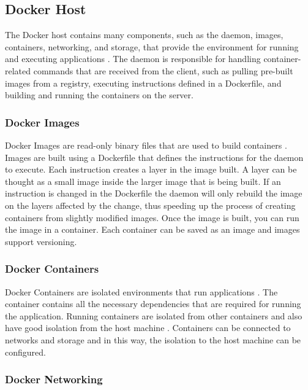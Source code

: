 \documentclass[fleqn,12pt]{olplainarticle}
\begin{document}
\subsection{Docker Host}

The Docker host contains many components, such as the daemon, images, containers, networking, and storage, that provide the environment for running and executing applications \citep{aquasec:docker_architecture}. The daemon is responsible for handling container-related commands that are received from the client, such as pulling pre-built images from a registry, executing instructions defined in a Dockerfile, and building and running the containers on the server.

\subsubsection{Docker Images}

Docker Images are read-only binary files that are used to build containers \citep{docker:overview}. Images are built using a Dockerfile that defines the instructions for the daemon to execute. Each instruction creates a layer in the image built. A layer can be thought as a small image inside the larger image that is being built. If an instruction is changed in the Dockerfile the daemon will only rebuild the image on the layers affected by the change, thus speeding up the process of creating containers from slightly modified images. Once the image is built, you can run the image in a container. Each container can be saved as an image and images support versioning.

\subsubsection{Docker Containers}

Docker Containers are isolated environments that run applications \citep{aquasec:docker_architecture}. The container contains all the necessary dependencies that are required for running the application. Running containers are isolated from other containers and also have good isolation from the host machine \citep{docker:security}. Containers can be connected to networks and storage and in this way, the isolation to the host machine can be configured.

\subsubsection{Docker Networking}
\end{document}
